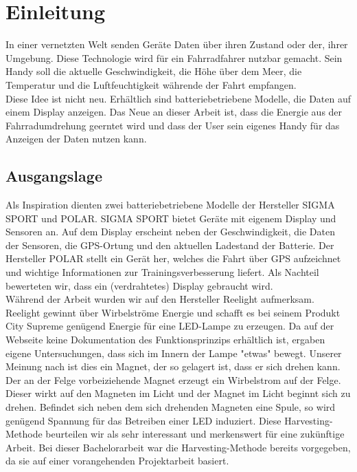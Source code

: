 \chapter{Einleitung}

In einer vernetzten Welt senden Geräte Daten über ihren Zustand oder der, ihrer Umgebung. Diese Technologie wird für ein Fahrradfahrer nutzbar gemacht. Sein Handy soll die aktuelle Geschwindigkeit, die Höhe über dem Meer, die Temperatur und die Luftfeuchtigkeit währende der Fahrt empfangen.\\

Diese Idee ist nicht neu. Erhältlich sind batteriebetriebene Modelle, die Daten auf einem Display anzeigen. Das Neue an dieser Arbeit ist, dass die Energie aus der Fahrradumdrehung geerntet wird und dass der User sein eigenes Handy für das Anzeigen der Daten nutzen kann.


\section{Ausgangslage}

Als Inspiration dienten zwei batteriebetriebene Modelle der Hersteller SIGMA SPORT und POLAR. SIGMA SPORT bietet Geräte mit eigenem Display und  Sensoren an. Auf dem Display erscheint neben der Geschwindigkeit, die Daten der Sensoren, die GPS-Ortung und den aktuellen Ladestand der Batterie. Der Hersteller POLAR stellt ein Gerät her, welches die Fahrt über GPS aufzeichnet und wichtige Informationen zur Trainingsverbesserung liefert. Als Nachteil bewerteten wir, dass ein (verdrahtetes) Display gebraucht wird.\\

Während der Arbeit wurden wir auf den Hersteller Reelight aufmerksam. Reelight gewinnt über Wirbelströme Energie und schafft es bei seinem Produkt City Supreme genügend Energie für eine LED-Lampe zu erzeugen. Da auf der Webseite keine Dokumentation des Funktionsprinzips erhältlich ist, ergaben eigene Untersuchungen, dass sich im Innern der Lampe "etwas" bewegt. Unserer Meinung nach ist dies ein Magnet, der so gelagert ist, dass er sich drehen kann. Der an der Felge vorbeiziehende Magnet erzeugt ein Wirbelstrom auf der Felge. Dieser wirkt auf den Magneten im Licht und der Magnet im Licht beginnt sich zu drehen. Befindet sich neben dem sich drehenden Magneten eine Spule, so wird genügend Spannung für das Betreiben einer LED induziert. Diese Harvesting-Methode beurteilen wir als sehr interessant und merkenswert für eine zukünftige Arbeit. Bei dieser Bachelorarbeit war die Harvesting-Methode bereits vorgegeben, da sie auf einer vorangehenden Projektarbeit basiert.\\



